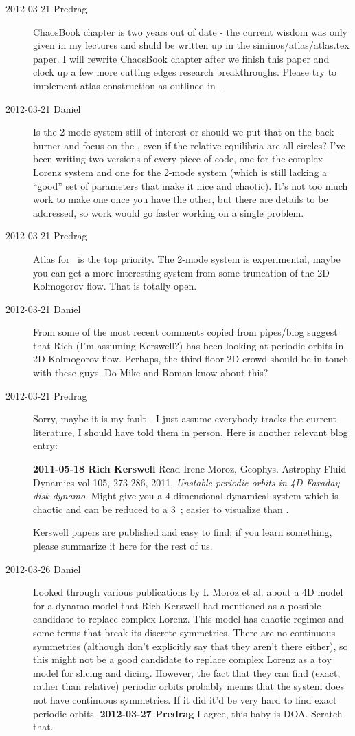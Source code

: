 \begin{description}
\item[2012-03-21 Predrag]
ChaosBook chapter is two years out of date - the current wisdom was only
given in my lectures and shuld be written up in the
siminos/atlas/atlas.tex paper. I will rewrite ChaosBook chapter after we
finish this paper and clock up a few more cutting edges research
breakthroughs. Please try to implement atlas construction as outlined in
.

\item[2012-03-21 Daniel]
Is the 2-mode system still of interest or should we put that on the
back-burner and focus on the \cLe, even if the relative equilibria are
all circles? I've been writing two versions of every piece of code, one
for the complex Lorenz system and one for the 2-mode system (which is
still lacking a ``good'' set of parameters that make it nice and
chaotic). It's not too much work to make one once you have the other, but
there are details to be addressed, so work would go faster working on a
single problem.

\item[2012-03-21 Predrag]
Atlas for \cLe\ is the top priority. The 2-mode system is experimental,
maybe you can get a more interesting system from some truncation of the
2D Kolmogorov flow. That is totally open.

\item[2012-03-21 Daniel]
From some of the most recent comments copied from pipes/blog suggest that
Rich (I'm assuming Kerswell?) has been looking at periodic orbits in 2D
Kolmogorov flow. Perhaps, the third floor 2D crowd should be in touch
with these guys. Do Mike and Roman know about this?

\item[2012-03-21 Predrag]
Sorry, maybe it is my fault - I just assume everybody tracks the current
literature, I should have told them in person. Here is another relevant
blog entry:

{\bf 2011-05-18  Rich Kerswell} Read Irene Moroz, Geophys. Astrophy Fluid
Dynamics vol 105, 273-286, 2011, \emph{Unstable periodic orbits in 4D
Faraday disk dynamo}. Might give you a 4-dimensional dynamical system
which is chaotic and can be reduced to a 3\dmn\ \statesp; easier to
visualize than {\cLf}.

Kerswell papers are published and easy to find; if you learn something,
please summarize it here for the rest of us.

\item[2012-03-26 Daniel] Looked through various publications by I. Moroz
et al. about a 4D model for a dynamo model that Rich Kerswell had
mentioned as a possible candidate to replace complex Lorenz. This model
has chaotic regimes and some terms that break its discrete symmetries.
There are no continuous symmetries (although don't explicitly say that
they aren't there either), so this might not be a good candidate to
replace complex Lorenz as a toy model for slicing and dicing. However,
the fact that they can find (exact, rather than relative) periodic orbits
probably means that the system does not have continuous symmetries. If it
did it'd be very hard to find exact periodic orbits.
{\bf 2012-03-27 Predrag} I agree, this baby is DOA. Scratch that.



\end{description}
